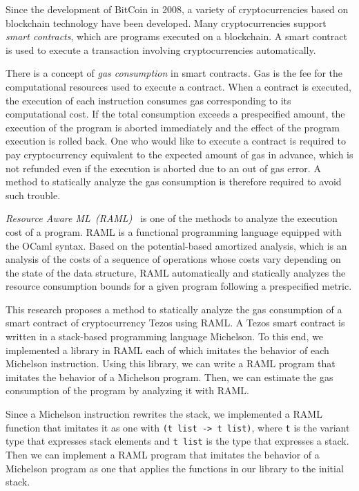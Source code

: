 \documentclass{kuisthesis}
\begin{document}
\begin{eabstract}
Since the development of BitCoin in 2008, a variety of cryptocurrencies based on blockchain technology have been developed. 
Many cryptocurrencies support \emph{smart contracts}, which are programs executed on a blockchain.
A smart contract is used to execute a transaction involving cryptocurrencies automatically.

There is a concept of \emph{gas consumption} in smart contracts. 
Gas is the fee for the computational resources used to execute a contract.
When a contract is executed,  the execution of each instruction consumes gas corresponding to its computational cost.
If the total consumption exceeds a prespecified amount, the execution of the program is aborted immediately and the effect of the program execution is rolled back.
One who would like to execute a contract is required to pay cryptocurrency equivalent to the expected amount of gas in advance, which is not refunded even if the execution is aborted due to an out of gas error.
A method to statically analyze the gas consumption is therefore required to avoid such trouble.

\emph{Resource Aware ML\ (RAML)\ } is one of the methods to analyze the execution cost of a program.
RAML is a functional programming language equipped with the OCaml syntax.
Based on the potential-based amortized analysis, which is an analysis of the costs of a sequence of operations whose costs vary depending on the state of the data structure,
RAML automatically and statically analyzes the resource consumption bounds for a given program following a prespecified metric.

This research proposes a method to statically analyze the gas consumption of a smart contract of cryptocurrency Tezos using RAML.
A Tezos smart contract is written in a stack-based programming language Michelson.
To this end, we implemented a library in RAML each of which imitates the behavior of each Michelson instruction.
Using this library, we can write a RAML program that imitates the behavior of a Michelson program.
Then, we can estimate the gas consumption of the program by analyzing it with RAML.

Since a Michelson instruction rewrites the stack, we implemented a RAML function that imitates it as one with {\tt (t list -> t list)}, where {\tt t} is the variant type that expresses stack elements and {\tt t list} is the type that expresses a stack.
Then we can implement a RAML program that imitates the behavior of a Michelson program as one that applies the functions in our library to the initial stack.


\end{eabstract}
\end{document}
